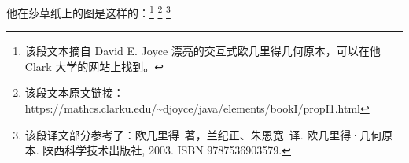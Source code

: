 \bohs

他在莎草纸上的图是这样的：\footnote{该段文本摘自 David E. Joyce 漂亮的交互式欧几里得几何原本，可以在他 Clark 大学的网站上找到。}
\footnote{{\color{blue} 该段文本原文链接：https://mathcs.clarku.edu/\textasciitilde{}djoyce/java/elements/bookI/propI1.html}}
\footnote{{\color{blue} 该段译文部分参考了：欧几里得\ 著，兰纪正、朱恩宽\ 译. 欧几里得·几何原本. 陕西科学技术出版社, 2003. ISBN 9787536903579.}}

\eohs


